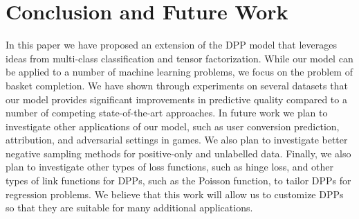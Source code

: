 \section{Conclusion and Future Work}
In this paper we have proposed an extension of the DPP model that leverages
ideas from multi-class classification and tensor factorization.  While our model
can be applied to a number of machine learning problems, we focus on the problem
of basket completion.  We have shown through experiments on several datasets
that our model provides significant improvements in predictive quality compared
to a number of competing state-of-the-art approaches. In future work we plan to
investigate other applications of our model, such as user conversion prediction,
attribution, and adversarial settings in games.  We also plan to investigate
better negative sampling methods for positive-only and unlabelled data. Finally,
we also plan to investigate other types of loss functions, such as hinge loss,
and other types of link functions for DPPs, such as the Poisson function, to
tailor DPPs for regression problems. We believe that this work will allow 
us to customize DPPs so that they are suitable for many additional applications.
